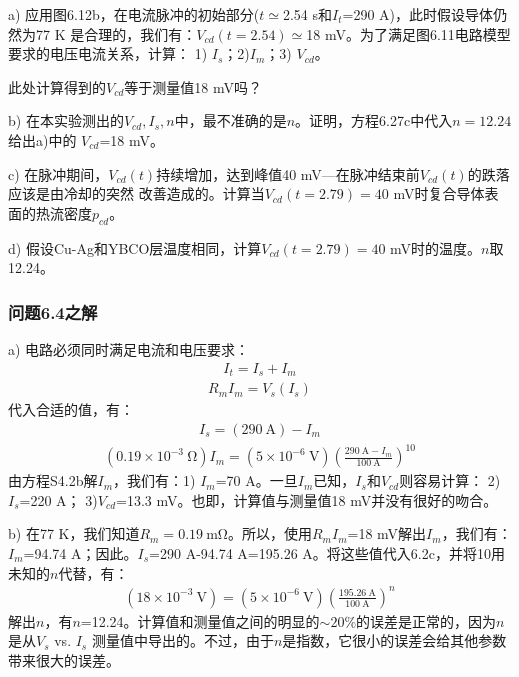 a) 应用图6.12b，在电流脉冲的初始部分($t\simeq$2.54 s和$I_t$=290 A)，此时假设导体仍然为77 K
是合理的，我们有：$V_{cd}(t=2.54)\simeq$18 mV。为了满足图6.11电路模型要求的电压电流关系，计算：
1) $I_s$；2)$I_m$；3) $V_{cd}$。

此处计算得到的$V_{cd}$等于测量值18 mV吗？

b) 在本实验测出的$V_{cd},I_s,n$中，最不准确的是$n$。证明，方程6.27c中代入$n=12.24$给出a)中的
$V_{cd}$=18 mV。

c) 在脉冲期间，$V_{cd}(t)$持续增加，达到峰值40 mV---在脉冲结束前$V_{cd}(t)$的跌落应该是由冷却的突然
改善造成的。计算当$V_{cd}(t=2.79)=40$ mV时复合导体表面的热流密度$p_{cd}$。

d) 假设Cu-Ag和YBCO层温度相同，计算$V_{cd}(t=2.79)=40$ mV时的温度。$n$取12.24。


\subsubsection{问题6.4之解}
a) 电路必须同时满足电流和电压要求：
\begin{align*}%
I_t=I_s+I_m \tag{S4.1a}
\end{align*}
\begin{align*}%
R_mI_m=V_s(I_s) \tag{S4.1b}
\end{align*}
代入合适的值，有：
\begin{align*}%
I_s=(290\ \mathrm{A})-I_m \tag{S4.2a}
\end{align*}
\begin{align*}%
(0.19\times10^{-3}\ \mathrm{\Omega})I_m=(5\times10^{-6}\ \mathrm{V})(\frac{290\ \mathrm {A}-I_m}{100\ \mathrm{A}})^{10} \tag{S4.2b}
\end{align*}
由方程S4.2b解$I_m$，我们有：1) $I_m$=70 A。一旦$I_m$已知，$I_s$和$V_{cd}$则容易计算：
2) $I_s$=220 A； 3)$V_{cd}$=13.3 mV。也即，计算值与测量值18 mV并没有很好的吻合。

b) 在77 K，我们知道$R_m=0.19\ \mathrm{m\Omega}$。所以，使用$R_m I_m$=18 mV解出$I_m$，我们有：
$I_m$=94.74 A；因此。$I_s$=290 A-94.74 A=195.26 A。将这些值代入6.2c，并将10用未知的$n$代替，有：
\begin{align*}%
(18\times10^{-3}\ \mathrm{V})=(5\times10^{-6}\ \mathrm{V})(\frac{195.26\ \mathrm{A}}{100\ \mathrm{A}})^n \tag{S4.3}
\end{align*}
解出$n$，有$n$=12.24。计算值和测量值之间的明显的$\sim 20\%$的误差是正常的，因为$n$是从$V_s$ vs. $I_s$
测量值中导出的。不过，由于$n$是指数，它很小的误差会给其他参数带来很大的误差。

